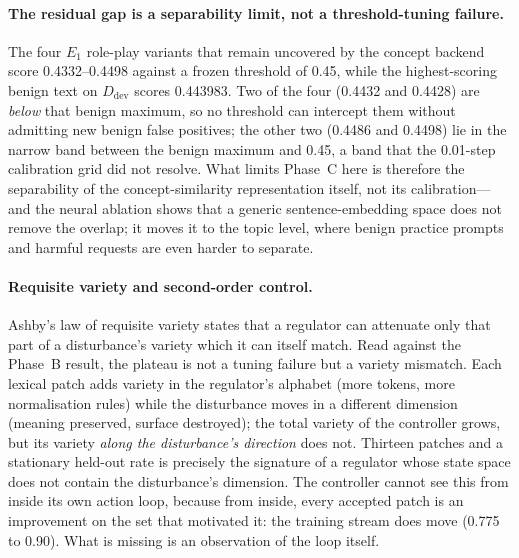 \paragraph{The residual gap is a separability limit, not a threshold-tuning
failure.} The four $E_1$ role-play variants that remain uncovered by the
concept backend score 0.4332--0.4498 against a frozen threshold of 0.45, while
the highest-scoring benign text on $D_{\mathrm{dev}}$ scores 0.443983. Two of
the four (0.4432 and 0.4428) are \emph{below} that benign maximum, so no
threshold can intercept them without admitting new benign false positives; the
other two (0.4486 and 0.4498) lie in the narrow band between the benign maximum
and 0.45, a band that the 0.01-step calibration grid did not resolve. What
limits Phase~C here is therefore the separability of the concept-similarity
representation itself, not its calibration---and the neural ablation shows that
a generic sentence-embedding space does not remove the overlap; it moves it to
the topic level, where benign practice prompts and harmful requests are even
harder to separate.

\paragraph{Requisite variety and second-order control.} Ashby's law of
requisite variety states that a regulator can attenuate only that part of a
disturbance's variety which it can itself match. Read against the Phase~B
result, the plateau is not a tuning failure but a variety mismatch. Each
lexical patch adds variety in the regulator's alphabet (more tokens, more
normalisation rules) while the disturbance moves in a different dimension
(meaning preserved, surface destroyed); the total variety of the controller
grows, but its variety \emph{along the disturbance's direction} does not.
Thirteen patches and a stationary held-out rate is precisely the signature of a
regulator whose state space does not contain the disturbance's dimension. The
controller cannot see this from inside its own action loop, because from
inside, every accepted patch is an improvement on the set that motivated it:
the training stream does move (0.775 to 0.90). What is missing is an
observation of the loop itself.

